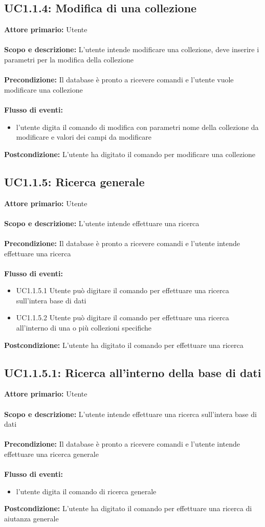 \documentclass{scalatekids-article}
\begin{document}
\subsection{UC1.1.4: Modifica di una collezione}
\textbf{Attore primario:} Utente \\ \\
\textbf{Scopo e descrizione:} L’utente intende modificare una collezione, deve inserire i parametri per la modifica della collezione\\ \\
\textbf{Precondizione:} Il database è pronto a ricevere comandi e l’utente vuole modificare una collezione\\ \\
\textbf{Flusso di eventi:}
\begin{itemize}
\item l’utente digita il comando di modifica con parametri nome della collezione da modificare e valori dei campi da modificare
\end{itemize}
\textbf{Postcondizione:} L’utente ha digitato il comando per modificare una collezione
\subsection{UC1.1.5: Ricerca generale}
\textbf{Attore primario:} Utente \\ \\
\textbf{Scopo e descrizione:} L’utente intende effettuare una ricerca\\ \\
\textbf{Precondizione:} Il database è pronto a ricevere comandi e l’utente intende effettuare una ricerca\\ \\
\textbf{Flusso di eventi:}
\begin{itemize}
\item UC1.1.5.1 Utente può digitare il comando per effettuare una ricerca sull’intera base di dati
\item UC1.1.5.2 Utente può digitare il comando per effettuare una ricerca all’interno di una o più collezioni specifiche
\end{itemize}
\textbf{Postcondizione:} L’utente ha digitato il comando per effettuare una ricerca
\subsection{UC1.1.5.1: Ricerca all'interno della base di dati}
\textbf{Attore primario:} Utente \\ \\
\textbf{Scopo e descrizione:} L’utente intende effettuare una ricerca sull’intera base di dati\\ \\
\textbf{Precondizione:} Il database è pronto a ricevere comandi e l’utente intende effettuare una ricerca generale\\ \\
\textbf{Flusso di eventi:}
\begin{itemize}
\item l’utente digita il comando di ricerca generale
\end{itemize}
\textbf{Postcondizione:} L’utente ha digitato il comando per effettuare una ricerca di aiutanza generale
\end{document}
